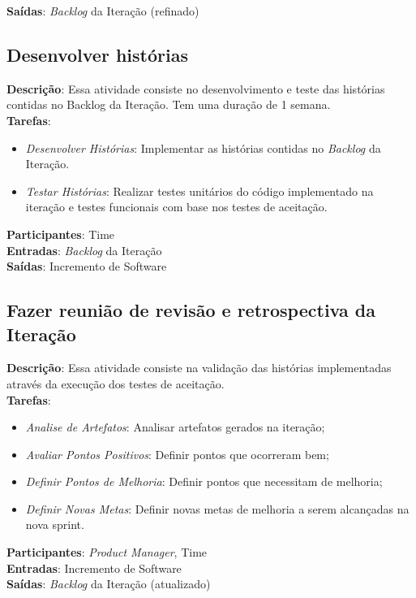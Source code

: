   \textbf{Saídas}:   \textit{Backlog} da Iteração (refinado)\\

\subsection{Desenvolver histórias}
  \textbf{Descrição}: Essa atividade consiste no desenvolvimento e teste das histórias contidas no Backlog da Iteração. Tem uma duração de 1 semana. \\

  \textbf{Tarefas}:

  \begin{itemize}
    \item \indent \textit{Desenvolver Histórias}: Implementar as histórias contidas no \textit{Backlog} da Iteração.

   \item \indent \textit{Testar Histórias}: Realizar testes unitários do código implementado na iteração e testes funcionais
   com base nos testes de aceitação.
  \end{itemize}

  \textbf{Participantes}: Time\\

  \textbf{Entradas}: \textit{Backlog} da Iteração \\

  \textbf{Saídas}:   Incremento de Software\\

\subsection{Fazer reunião de revisão e retrospectiva da Iteração}
  \textbf{Descrição}: Essa atividade consiste na validação das histórias implementadas através da execução dos testes de aceitação. \\

  \textbf{Tarefas}:
  \begin{itemize}
   \item \indent \textit{Analise de Artefatos}: Analisar artefatos gerados na iteração;

   \item \indent \textit{Avaliar Pontos Positivos}: Definir pontos que ocorreram bem;

   \item \indent \textit{Definir Pontos de Melhoria}: Definir pontos que necessitam de melhoria;

   \item \indent \textit{Definir Novas Metas}: Definir novas metas de melhoria a serem alcançadas na nova sprint.
  \end{itemize}

  \textbf{Participantes}: \textit{Product Manager}, Time\\

  \textbf{Entradas}: Incremento de Software \\

  \textbf{Saídas}:   \textit{Backlog} da Iteração (atualizado)\\
